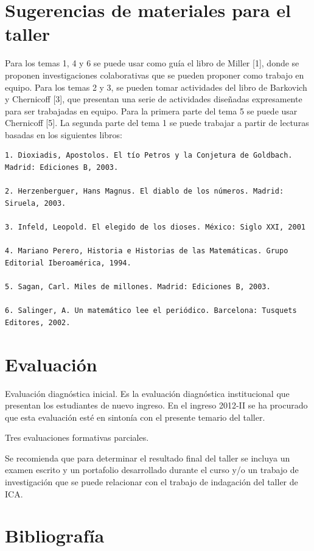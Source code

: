 \documentclass[]{book}
\begin{document}
\section{Sugerencias de materiales para el
taller}\label{sugerencias-de-materiales-para-el-taller}

Para los temas 1, 4 y 6 se puede usar como guía el libro de Miller
{[}1{]}, donde se proponen investigaciones colaborativas que se pueden
proponer como trabajo en equipo. Para los temas 2 y 3, se pueden tomar
actividades del libro de Barkovich y Chernicoff {[}3{]}, que presentan
una serie de actividades diseñadas expresamente para ser trabajadas en
equipo. Para la primera parte del tema 5 se puede usar Chernicoff
{[}5{]}. La segunda parte del tema 1 se puede trabajar a partir de
lecturas basadas en los siguientes libros:

\begin{verbatim}
1. Dioxiadis, Apostolos. El tío Petros y la Conjetura de Goldbach. Madrid: Ediciones B, 2003.

2. Herzenberguer, Hans Magnus. El diablo de los números. Madrid: Siruela, 2003.

3. Infeld, Leopold. El elegido de los dioses. México: Siglo XXI, 2001

4. Mariano Perero, Historia e Historias de las Matemáticas. Grupo Editorial Iberoamérica, 1994.

5. Sagan, Carl. Miles de millones. Madrid: Ediciones B, 2003.

6. Salinger, A. Un matemático lee el periódico. Barcelona: Tusquets Editores, 2002.
\end{verbatim}

\section{Evaluación}\label{evaluaciuxf3n}

Evaluación diagnóstica inicial. Es la evaluación diagnóstica
institucional que presentan los estudiantes de nuevo ingreso. En el
ingreso 2012-II se ha procurado que esta evaluación esté en sintonía con
el presente temario del taller.

Tres evaluaciones formativas parciales.

Se recomienda que para determinar el resultado final del taller se
incluya un examen escrito y un portafolio desarrollado durante el curso
y/o un trabajo de investigación que se puede relacionar con el trabajo
de indagación del taller de ICA.

\section{Bibliografía}\label{bibliografuxeda}
\end{document}
